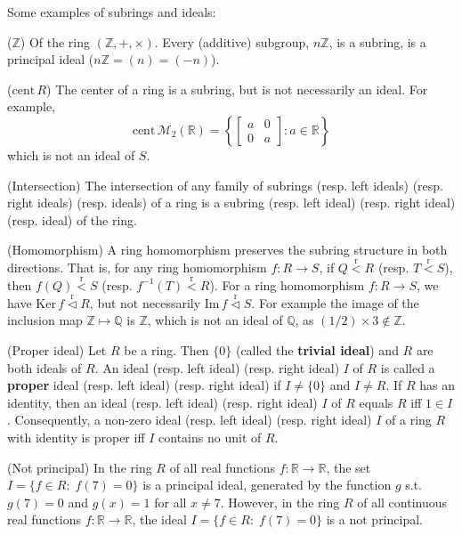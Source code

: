 \documentclass{article}
\newcommand{\nles}{\vartriangleleft}
\newcommand{\Ker}{\text{Ker}\,}
\newcommand{\Ima}{\text{Im}\,}
\newcommand{\subr}{\overset{\text{r}}{<}} %
\newcommand{\ideal}{\overset{\text{r}}{\nles}} %
\newcommand{\cent}{\text{cent}\,} %
\begin{document}
\begin{Rmk}{}
    Some examples of subrings and ideals:
    \begin{compactenum}
        \item ($\mathbb{Z}$) \textcolor{Th}{Of the ring $(\mathbb{Z},+,\times)$. Every (additive) subgroup, $n\mathbb{Z}$, is a subring, is a principal ideal ($n\mathbb{Z} = (n) = (-n)$).}
        \item ($\cent R$) \textcolor{Th}{The center of a ring is a subring, but is not necessarily an ideal.} For example, \textcolor{Th}{
        $$ \cent\mathcal{M}_2(\mathbb{R}) = \left\{ \begin{bmatrix}
            a & 0 \\
            0 & a
        \end{bmatrix} : a\in \mathbb{R} \right\} $$
        which is not an ideal of $S$.}
        \item (Intersection) \textcolor{Th}{The intersection of any family of subrings (resp. left ideals) (resp. right ideals) (resp. ideals) of a ring is a subring (resp. left ideal) (resp. right ideal) (resp. ideal) of the ring.} 
        \item (Homomorphism) \textcolor{Th}{A ring homomorphism preserves the subring structure in both directions.} That is, for any ring homomorphism $f: R\to S$, if $Q\subr R$ (resp. $T\subr S$), then $f(Q)\subr S$ (resp. $f^{-1}(T)\subr R$). \textcolor{Th}{For a ring homomorphism $f: R\to S$, we have $\Ker f\ideal R$, but not necessarily $\Ima f\ideal S$.} For example the image of the inclusion map $\mathbb{Z}\mapsto \mathbb{Q}$ is $\mathbb{Z}$, which is not an ideal of $\mathbb{Q}$, as $(1/2)\times 3\notin \mathbb{Z}$.
        \item (Proper ideal) \textcolor{Th}{Let $R$ be a ring. Then $\{0\}$ (called the \textbf{trivial ideal}) and $R$ are both ideals of $R$.} \textcolor{Df}{An ideal (resp. left ideal) (resp. right ideal) $I$ of $R$ is called a \textbf{proper} ideal (resp. left ideal) (resp. right ideal) if $I\neq \{0\}$ and $I\neq R$.} \textcolor{Th}{If $R$ has an identity, then an ideal (resp. left ideal) (resp. right ideal) $I$ of $R$ equals $R$ iff $1\in I$.} Consequently, \textcolor{Th}{a non-zero ideal (resp. left ideal) (resp. right ideal) $I$ of a ring $R$ with identity is proper iff $I$ contains no unit of $R$.}
        \item (Not principal) \textcolor{Th}{In the ring $R$ of all real functions $f: \mathbb{R}\to\mathbb{R}$, the set $I = \{f\in R:\; f(7) = 0\}$ is a principal ideal, generated by the function $g$ s.t. $g(7) = 0$ and $g(x) = 1$ for all $x\neq 7$.} However, \textcolor{Th}{in the ring $R$ of all continuous real functions $f: \mathbb{R}\to\mathbb{R}$, the ideal $I = \{f\in R:\; f(7) = 0\}$ is a not principal.} 
    \end{compactenum}
\end{Rmk}
\end{document}
